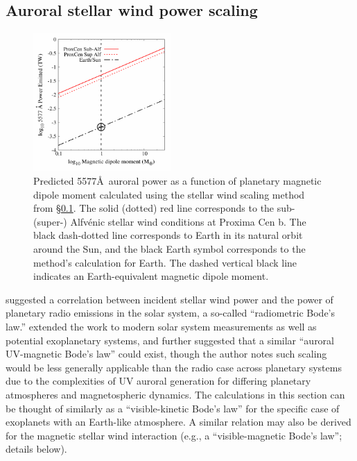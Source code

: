 \documentclass{emulateapj}
\begin{document}
\subsection{Auroral stellar wind power scaling}
\label{sec:signal_m1}

\begin{figure}[bt]
\includegraphics[width=0.47\textwidth, angle=0]{plot_swpower.pdf}
\caption{Predicted 5577\AA\ auroral power as a function of planetary magnetic dipole moment calculated using the stellar wind scaling method from \S\ref{sec:signal_m1}. The solid (dotted) red line corresponds to the sub-\mbox{(super-)} Alfv\'{e}nic stellar wind conditions at Proxima Cen b. The black dash-dotted line corresponds to Earth in its natural orbit around the Sun, and the black Earth symbol corresponds to the method's calculation for Earth. The dashed vertical black line indicates an Earth-equivalent magnetic dipole moment.\\[0in]}
\label{fig:auroral_power}
\end{figure}

\citet{Desch1984} suggested a correlation between incident stellar wind power and the power of planetary radio emissions in the solar system, a so-called ``radiometric Bode's law.'' \citet{Zarka2006,Zarka2007} extended the work to modern solar system measurements as well as potential exoplanetary systems, and further suggested that a similar ``auroral UV-magnetic Bode's law'' could exist, though the author notes such scaling would be less generally applicable than the radio case across planetary systems due to the complexities of UV auroral generation for differing planetary atmospheres and magnetospheric dynamics. The calculations in this section can be thought of similarly as a ``visible-kinetic Bode's law'' for the specific case of exoplanets with an Earth-like atmosphere. A similar relation may also be derived for the magnetic stellar wind interaction (e.g., a ``visible-magnetic Bode's law''; details below).
\end{document}
